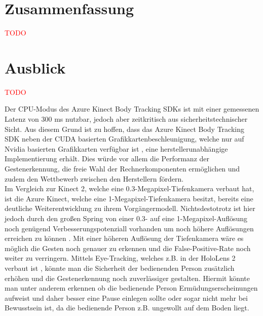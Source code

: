 \section{Zusammenfassung}

\textcolor{red}{TODO}

\section{Ausblick}
\textcolor{red}{TODO}




Der CPU-Modus des Azure Kinect Body Tracking SDKs ist mit einer gemessenen Latenz von 300 ms nutzbar, jedoch aber zeitkritisch aus sicherheitstechnischer Sicht. Aus diesem Grund ist zu hoffen, dass das Azure Kinect Body Tracking SDK neben der CUDA basierten Grafikkartenbeschleunigung, welche nur auf Nvidia basierten Grafikkarten verfügbar ist \cite{encausse_body_nodate}, eine herstellerunabhängige Implementierung erhält. Dies würde vor allem die Performanz der Gestenerkennung, die freie Wahl der Rechnerkomponenten ermöglichen und zudem den Wettbewerb zwischen den Herstellern fördern.\\

Im Vergleich zur Kinect 2, welche eine \num{0,3}-Megapixel-Tiefenkamera verbaut hat, ist die Azure Kinect, welche eine 1-Megapixel-Tiefenkamera besitzt, bereits eine deutliche Weiterentwicklung zu ihrem Vorgängermodell. Nichtsdestotrotz ist hier jedoch durch den großen Spring von einer \num{0,3}- auf eine 1-Megapixel-Auflösung noch genügend Verbesserungspotenziall vorhanden um noch höhere Auflösungen erreichen zu können \cite{bamji__2018}. Mit einer höheren Auflösung der Tiefenkamera wäre es möglich die Gesten noch genauer zu erkennen und die False-Positive-Rate noch weiter zu verringern. Mittels Eye-Tracking, welches z.B. in der HoloLens 2 verbaut ist \cite{hololens2_hardware_nodate}, könnte man die Sicherheit der bedienenden Person zusätzlich erhöhen und die Gestenerkennung noch zuverlässiger gestalten. Hiermit könnte man unter anderem erkennen ob die bedienende Person Ermüdungserscheinungen aufweist und daher besser eine Pause einlegen sollte oder sogar nicht mehr bei Bewusstsein ist, da die bedienende Person z.B. ungewollt auf dem Boden liegt.\\

